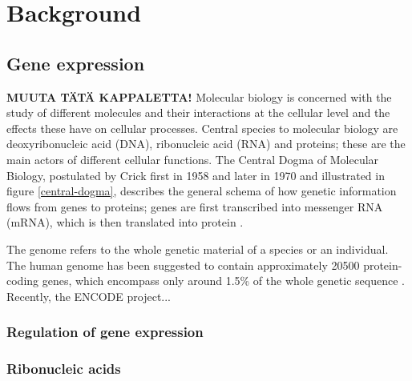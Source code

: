 


\section{Background}\label{background}











\subsection{Gene expression}\label{gene-expression}

\textbf{MUUTA TÄTÄ KAPPALETTA!} Molecular biology is concerned with the study
of different molecules and their interactions at the cellular level and the
effects these have on cellular processes. Central species to molecular biology
are deoxyribonucleic acid (DNA), ribonucleic acid (RNA) and proteins; these
are the main actors of different cellular functions. The Central Dogma of
Molecular Biology, postulated by Crick first in 1958 and later in 1970 and
illustrated in figure \ref{central-dogma}, describes the general schema of
how genetic information flows from genes to proteins; genes are first
transcribed into messenger RNA (mRNA), which is then translated into protein
\citep{Crick1970,T0}.

The genome refers to the whole genetic material of a species or an individual.
The human genome has been suggested to contain approximately 20500 protein-
coding genes, which encompass only around 1.5\% of the whole genetic sequence
\citep{Clamp2007,MistäSilvaKeksinyTonProssan}. Recently, the ENCODE project...




\subsubsection{Regulation of gene expression}\label{regulation-of-gene-expression}





\subsubsection{Ribonucleic acids}\label{ribonucleic-acids}








